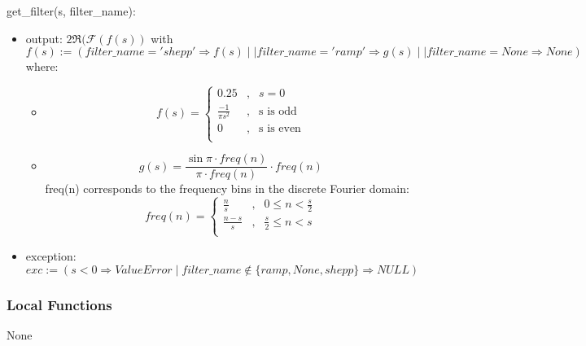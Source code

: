 \documentclass[12pt, titlepage]{article}
\begin{document}
\noindent get\_filter(s, filter\_name):
\begin{itemize}
\item output: \(2\Re(\mathcal{F}(f(s))\) with\\
  \(f(s) := (filter\_name = 'shepp' \Rightarrow f(s) \mid\mid filter\_name = 'ramp' \Rightarrow g(s) \mid\mid filter\_name = None \Rightarrow None)\) where: \\
  \begin{itemize}
    \item
      \begin{equation}
        f(s) =
        \left\{
          \begin{aligned}
            0.25 &, & s = 0 \\
            \frac{-1}{{\pi s}^2} &, & \text{s is odd}\\
            0 &, & \text{s is even}\\
          \end{aligned}
        \right.
      \end{equation}

    \item
      \begin{equation}
        g(s) =
        \frac{\sin{\pi\cdot freq(n)}}{\pi\cdot freq(n)} \cdot freq(n)
      \end{equation}
      freq(n) corresponds to the frequency bins in the discrete Fourier domain:\\
      \begin{equation}
        freq(n) =
        \left\{
          \begin{aligned}
            \frac{n}{s} &, & 0 \leq n < \frac{s}{2} \\
            \frac{n - s}{s} &, & \frac{s}{2} \leq n < s \\
          \end{aligned}
        \right.
      \end{equation}
    \end{itemize}

\item exception: \(exc := (s < 0 \Rightarrow ValueError \mid filter\_name \notin \{ramp, None, shepp\}
  \Rightarrow NULL)\)
\end{itemize}


\subsubsection{Local Functions}
None

\newpage
\end{document}
